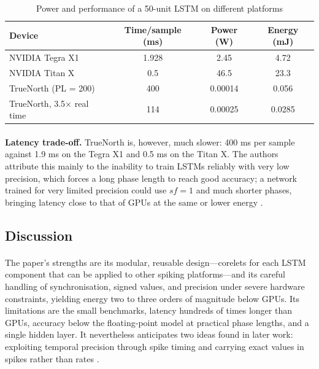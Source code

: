 \documentclass[12pt,a4paper,final]{extreport}
\begin{document}
{\renewcommand{\arraystretch}{1.12}
\begin{table}[htbp]
\centering
\caption{Power and performance of a 50-unit LSTM on different platforms \cite{p3}}\label{tab:p3_power}
\small
\begin{tabular}{|l|c|c|c|}
\hline
\textbf{Device} & \textbf{Time/sample (ms)} & \textbf{Power (W)} & \textbf{Energy (mJ)} \\ \hline
NVIDIA Tegra X1 & 1.928 & 2.45 & 4.72 \\ \hline
NVIDIA Titan X & 0.5 & 46.5 & 23.3 \\ \hline
TrueNorth (PL = 200) & 400 & 0.00014 & 0.056 \\ \hline
TrueNorth, 3.5$\times$ real time & 114 & 0.00025 & 0.0285 \\ \hline
\end{tabular}
\end{table}}

\paragraph{} \textbf{Latency trade-off.} TrueNorth is, however, much slower: 400 ms per sample against 1.9 ms on the Tegra X1 and 0.5 ms on the Titan X. The authors attribute this mainly to the inability to train LSTMs reliably with very low precision, which forces a long phase length to reach good accuracy; a network trained for very limited precision could use $sf=1$ and much shorter phases, bringing latency close to that of GPUs at the same or lower energy \cite{p3}.

\subsection{Discussion}

\paragraph{} The paper's strengths are its modular, reusable design---corelets for each LSTM component that can be applied to other spiking platforms---and its careful handling of synchronisation, signed values, and precision under severe hardware constraints, yielding energy two to three orders of magnitude below GPUs. Its limitations are the small benchmarks, latency hundreds of times longer than GPUs, accuracy below the floating-point model at practical phase lengths, and a single hidden layer. It nevertheless anticipates two ideas found in later work: exploiting temporal precision through spike timing \cite{p1} and carrying exact values in spikes rather than rates \cite{p4}.
\end{document}
